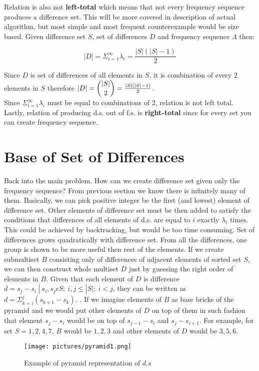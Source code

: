  Relation is also not \textbf{left-total} which means that not every frequency sequence produces a difference set. This will be more covered in description of actual algorithm, but most simple and most frequent counterexample would be size based. Given difference set $S$, set of differences $D$ and frequency sequence $\Lambda$ then:

 $$|D| = \Sigma_{i = 1} ^\infty \lambda_i = \frac{|S|(|S|-1)}{2}$$ 

Since $D$ is set of differences of all elements in $S$, it is combination of every 2 elements in $S$ therefore
$|D| = \dbinom{|S|}{2} = \frac{|S|(|S|-1)}{2}$.\\

Since $\Sigma_{i = 1} ^\infty \lambda_i$ must be equal to combinations of 2, relation is not left total.\\

Lastly, relation of producing d.s. out of f.s. is \textbf{right-total} since for every set you can create frequency sequence.\\

\section{Base of Set of Differences} 

Back into the main problem. How can we create difference set given only the frequency sequence? From previous section we know there is infinitely many of them. Basically, we can pick positive integer be the first (and lowest) element of difference set. Other elements of difference set must be then added to satisfy the conditions that differences of all elements of d.s. are equal to $i$ exactly $\lambda_i$ times. This could be achieved by backtracking, but would be too time consuming. Set of differences grows quadratically with difference set.
 From all the differences, one group is shown to be more useful then rest of the elements. If we create submultiset $B$ consisting only of differences of adjacent elements of sorted set $S$, we can then construct whole multiset $D$ just by guessing the right order of elements in $B$.  Given that each element of $D$ is difference $d = s_j - s_i \ |\ s_i,s_j \epsilon S;\ i,j \leq |S|;\ i<j$, they can be written as $d = \Sigma_{k = i}^j (s_{k+1} - s_k)$. . If we imagine elements of $B$ as base bricks of the pyramid and we would put other elements of $D$ on top of them in such fashion that element $s_j - s_i$ would be on top of $s_{j-1}- s_i$ and $s_j - s_{i+1}$. 
For example, for set $S = {1,2,4,7}$, $B$ would be ${1,2,3}$ and other elements of $D$ would be ${3,5,6}$.
\begin{center}
\begin{figure}[here]
 \texttt{[image: pictures/pyramid1.png]}
 \caption{Example of pyramid representation of $d.s $}
 \label{fig:Pyramid example number 1}
 \end{figure}
\end{center}

